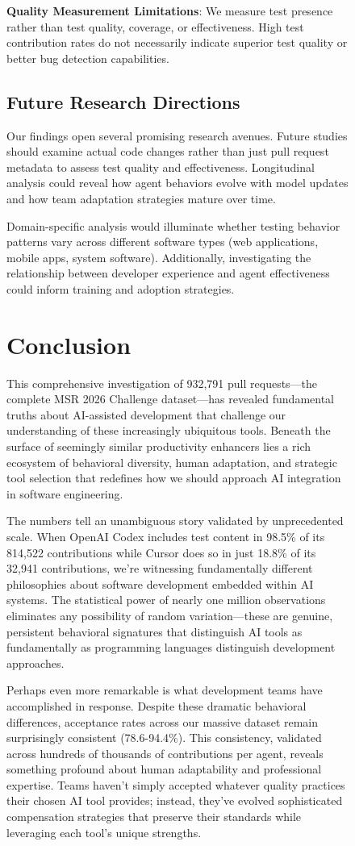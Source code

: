 \documentclass[conference]{IEEEtran}
\begin{document}
\begin{figure}[H]
\textbf{Quality Measurement Limitations}: We measure test presence rather than test quality, coverage, or effectiveness. High test contribution rates do not necessarily indicate superior test quality or better bug detection capabilities.

\subsection{Future Research Directions}

Our findings open several promising research avenues. Future studies should examine actual code changes rather than just pull request metadata to assess test quality and effectiveness. Longitudinal analysis could reveal how agent behaviors evolve with model updates and how team adaptation strategies mature over time.

Domain-specific analysis would illuminate whether testing behavior patterns vary across different software types (web applications, mobile apps, system software). Additionally, investigating the relationship between developer experience and agent effectiveness could inform training and adoption strategies.

\section{Conclusion}

This comprehensive investigation of 932,791 pull requests—the complete MSR 2026 Challenge dataset—has revealed fundamental truths about AI-assisted development that challenge our understanding of these increasingly ubiquitous tools. Beneath the surface of seemingly similar productivity enhancers lies a rich ecosystem of behavioral diversity, human adaptation, and strategic tool selection that redefines how we should approach AI integration in software engineering.

The numbers tell an unambiguous story validated by unprecedented scale. When OpenAI Codex includes test content in 98.5\% of its 814,522 contributions while Cursor does so in just 18.8\% of its 32,941 contributions, we're witnessing fundamentally different philosophies about software development embedded within AI systems. The statistical power of nearly one million observations eliminates any possibility of random variation—these are genuine, persistent behavioral signatures that distinguish AI tools as fundamentally as programming languages distinguish development approaches.

Perhaps even more remarkable is what development teams have accomplished in response. Despite these dramatic behavioral differences, acceptance rates across our massive dataset remain surprisingly consistent (78.6-94.4\%). This consistency, validated across hundreds of thousands of contributions per agent, reveals something profound about human adaptability and professional expertise. Teams haven't simply accepted whatever quality practices their chosen AI tool provides; instead, they've evolved sophisticated compensation strategies that preserve their standards while leveraging each tool's unique strengths.


\end{figure}
\end{document}
